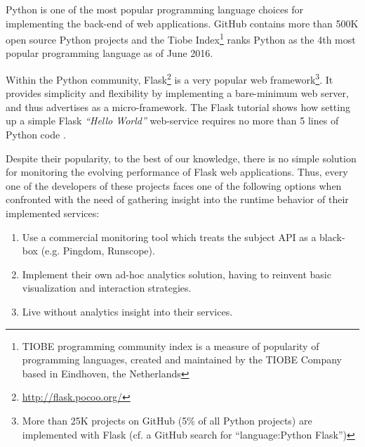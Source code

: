\documentclass{sig-alternate-05-2015}
\begin{document}
Python is one of the most popular programming language choices for implementing the back-end of web applications. GitHub contains more than 500K open source Python projects and the Tiobe Index\footnote{TIOBE programming community index is a measure of popularity of programming languages, created and maintained by the TIOBE Company based in Eindhoven, the Netherlands} ranks Python as the 4th most popular programming language as of June 2016.
 
Within the Python community, Flask\footnote{\url{http://flask.pocoo.org/}} is a very popular web framework\footnote{More than 25K projects on GitHub (5\% of all Python projects) are implemented with Flask (cf. a GitHub search for ``language:Python Flask'')}. It provides simplicity and flexibility by implementing a bare-minimum web server, and thus advertises as a micro-framework. The Flask tutorial shows how setting up a simple Flask {\em ``Hello World''} web-service requires no more than 5 lines of Python code \cite{ flask:tutorial}.
 
Despite their popularity, to the best of our knowledge, there is no simple solution for monitoring the evolving performance of Flask web applications. Thus, every one of the developers of these projects faces one of the following options when confronted with the need of gathering insight into the runtime behavior of their implemented services: 

  \begin{enumerate}

    \item Use a commercial monitoring tool which treats the subject API as a black-box (e.g. Pingdom, Runscope). 

    \item Implement their own ad-hoc analytics solution, having to reinvent basic visualization and interaction strategies. 

    \item Live without analytics insight into their services.

  \end{enumerate}

\end{document}
